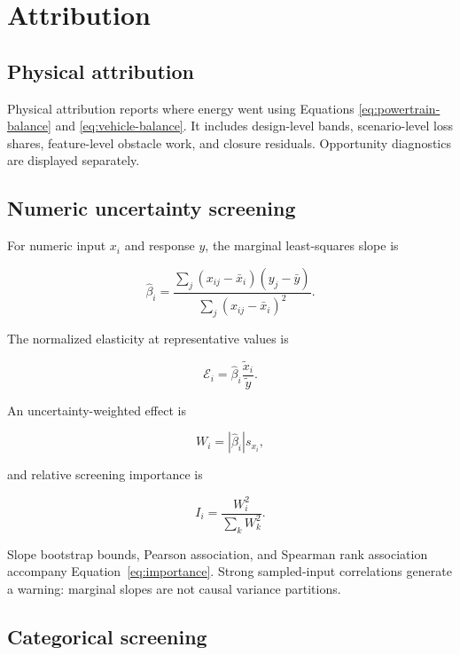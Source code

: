 \documentclass[11pt,oneside]{report}
\begin{document}
\chapter{Attribution}\label{ch:attribution}

\section{Physical attribution}

Physical attribution reports where energy went using Equations
\eqref{eq:powertrain-balance} and \eqref{eq:vehicle-balance}.  It includes design-level
bands, scenario-level loss shares, feature-level obstacle work, and closure residuals.
Opportunity diagnostics are displayed separately.

\section{Numeric uncertainty screening}

For numeric input $x_i$ and response $y$, the marginal least-squares slope is

\begin{equation}
\widehat\beta_i=\frac{\sum_j(x_{ij}-\bar{x}_i)(y_j-\bar{y})}
                         {\sum_j(x_{ij}-\bar{x}_i)^2}.
\end{equation}

The normalized elasticity at representative values is

\begin{equation}
\mathcal{E}_i=\widehat\beta_i\frac{\widetilde x_i}{\widetilde y}.
\end{equation}

An uncertainty-weighted effect is

\begin{equation}
W_i=|\widehat\beta_i|s_{x_i},
\end{equation}

and relative screening importance is

\begin{equation}
I_i=\frac{W_i^2}{\sum_k W_k^2}.
\label{eq:importance}
\end{equation}

Slope bootstrap bounds, Pearson association, and Spearman rank association accompany
Equation~\eqref{eq:importance}.  Strong sampled-input correlations generate a warning:
marginal slopes are not causal variance partitions.

\section{Categorical screening}
\end{document}
